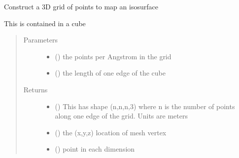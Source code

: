 \documentclass[a4paper,10pt,english,openany,oneside]{sphinxmanual}
\begin{document}
\begin{fulllineitems}
\begin{fulllineitems}
\begin{fulllineitems}
\label{\detokenize{reference/generated/paramagpy.metal.Metal.make_mesh:paramagpy.metal.Metal.make_mesh}}
\sphinxAtStartPar
Construct a 3D grid of points to map an isosurface

\sphinxAtStartPar
This is contained in a cube
\begin{quote}\begin{description}
\item[{Parameters}] \leavevmode\begin{itemize}
\item {} 
\sphinxAtStartPar
{} (\sphinxstyleliteralemphasis{\sphinxupquote{ (}}\sphinxstyleliteralemphasis{\sphinxupquote{)}}) \textendash{} the points per Angstrom in the grid

\item {} 
\sphinxAtStartPar
{} (\sphinxstyleliteralemphasis{\sphinxupquote{ (}}\sphinxstyleliteralemphasis{\sphinxupquote{)}}) \textendash{} the length of one edge of the cube

\end{itemize}

\item[{Returns}] \leavevmode
\sphinxAtStartPar
\begin{itemize}
\item {} 
\sphinxAtStartPar
{} () \textendash{} This has shape (n,n,n,3) where n is the number of points
along one edge of the grid. Units are meters

\item {} 
\sphinxAtStartPar
{} () \textendash{} the (x,y,z) location of mesh vertex

\item {} 
\sphinxAtStartPar
{} () \textendash{} point in each dimension


\end{itemize}
\end{description}
\end{quote}
\end{fulllineitems}
\end{fulllineitems}
\end{fulllineitems}
\end{document}
